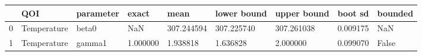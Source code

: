 \begin{tabular}{lllllllll}
\toprule
 & QOI & parameter & exact & mean & lower bound & upper bound & boot sd & bounded \\
\midrule
0 & Temperature & beta0 & NaN & 307.244594 & 307.225740 & 307.261038 & 0.009175 & NaN \\
1 & Temperature & gamma1 & 1.000000 & 1.938818 & 1.636828 & 2.000000 & 0.099070 & False \\
\bottomrule
\end{tabular}
